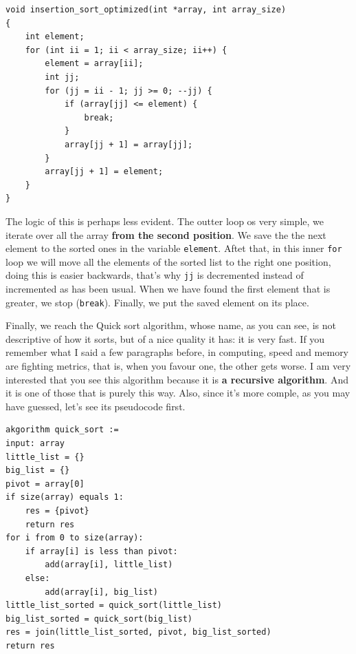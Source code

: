 \documentclass[a4paper]{article}
\begin{document}
\noindent
\begin{minipage}[H]{\linewidth}
\mbox{}
\begin{lstlisting}[style=C, label={lst:insertionOptimized},
caption={Alternative implementation of insertion algorithm}]
void insertion_sort_optimized(int *array, int array_size)
{
    int element;
    for (int ii = 1; ii < array_size; ii++) {
        element = array[ii];
        int jj;
        for (jj = ii - 1; jj >= 0; --jj) {
            if (array[jj] <= element) {
                break;
            }
            array[jj + 1] = array[jj];
        }
        array[jj + 1] = element;
    }
}
\end{lstlisting}
\end{minipage}

The logic of this is perhaps less evident. The outter loop os very simple, we
iterate over all the array \textbf{from the second position}. We save the
the next element to the sorted ones in the variable \verb!element!. Aftet that,
in this inner \verb!for! loop we will move all the elements of the sorted list
to the right one position, doing this is easier backwards, that's why \verb!jj!
is decremented instead of incremented as has been usual. When we have found the
first element that is greater, we stop (\verb!break!). Finally, we put the
saved element on its place.

Finally, we reach the Quick sort algorithm, whose name, as you can see, is not
descriptive of how it sorts, but of a nice quality it has: it is very fast. If
you remember what I said a few paragraphs before, in computing, speed and
memory are fighting metrics, that is, when you favour one, the other gets worse.
I am very interested that you see this algorithm because it is \textbf{a
recursive algorithm}. And it is one of those that is purely this way. Also,
since it's more comple, as you may have guessed, let's see its pseudocode first.



\noindent
\begin{minipage}[H]{\linewidth}
\begin{lstlisting}[style=pseudoCode]
akgorithm quick_sort :=
input: array
little_list = {}
big_list = {}
pivot = array[0]
if size(array) equals 1:
    res = {pivot}
    return res
for i from 0 to size(array):
    if array[i] is less than pivot:
        add(array[i], little_list)
    else:
        add(array[i], big_list)
little_list_sorted = quick_sort(little_list)
big_list_sorted = quick_sort(big_list)
res = join(little_list_sorted, pivot, big_list_sorted)
return res
\end{lstlisting}
\end{minipage}
\end{document}
